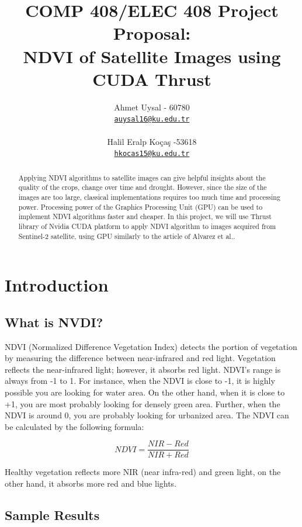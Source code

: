 \documentclass{article} %
\title{COMP 408/ELEC 408 Project Proposal:\\ NDVI of Satellite Images using CUDA Thrust}
\author{
Ahmet Uysal - 60780\\
\href{mailto:auysal16@ku.edu.tr}{\texttt{auysal16@ku.edu.tr}}\\
 \\
Halil Eralp Ko\c{c}a\c{s} -53618\\
\href{mailto:hkocas15@ku.edu.tr}{\texttt{hkocas15@ku.edu.tr}}
}
\begin{document}
\maketitle

\begin{abstract}
Applying NDVI algorithms to satellite images can give helpful insights about the quality of the crops, change over time and drought. However, since the size of the images are too large, classical implementations requires too much time and processing power. Processing power of the Graphics Processing Unit (GPU) can be used to implement NDVI algorithms faster and cheaper. In this project, we will use Thrust library of Nvidia CUDA platform to apply NDVI algorithm to images acquired from Sentinel-2 satellite, using GPU similarly to the article of Alvarez et al.\cite{ndvi-thrust}. 
\end{abstract}

\section{Introduction}

\subsection{What is NVDI?}
NDVI (Normalized Difference Vegetation Index) detects the portion of vegetation by measuring the difference between near-infrared and red light. Vegetation reflects the near-infrared light; however, it absorbs red light. NDVI’s range is always from -1 to 1. For instance, when the NDVI is close to -1, it is highly possible you are looking for water area. On the other hand, when it is close to +1, you are most probably looking for densely green area. Further, when the NDVI is around 0, you are probably looking for urbanized area. The NDVI can be calculated by the following formula:

\begin{equation*}
NDVI = \frac{NIR - Red}{NIR + Red}
\end{equation*}

Healthy vegetation reflects more NIR (near infra-red) and green light, on the other hand, it absorbs more red and blue lights. 

\newpage

\subsection{Sample Results}
\end{document}
